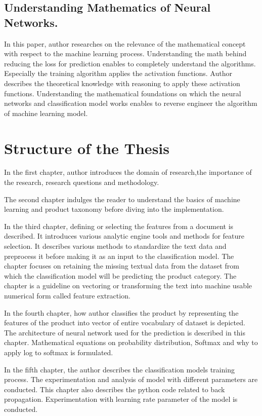 \subsection{Understanding Mathematics of Neural Networks.}

In this paper, author researches on the relevance of the mathematical concept with respect to the machine learning process. Understanding the math behind reducing the loss for prediction enables to completely understand the algorithms. Especially the training algorithm applies the activation functions. Author describes the theoretical knowledge with reasoning to apply these activation functions. Understanding the mathematical foundations on which the neural networks and classification model works enables to reverse engineer the algorithm of machine learning model.

\clearpage

\section{Structure of the Thesis}

In the first chapter, author introduces the domain of research,the importance of the research, research questions and methodology.

The second chapter indulges the reader to understand the basics of machine learning and product taxonomy before diving into the implementation.

In the third chapter, defining or selecting the features from a document is described. It introduces various analytic engine tools and methods for feature selection. It describes various methods to standardize the text data and preprocess it before making it as an input to the classification model. The chapter focuses on retaining the missing textual data from the dataset from which the classification model will be predicting the product category. The chapter is a guideline on vectoring or transforming the text into machine usable numerical form called feature extraction.

In the fourth chapter, how author classifies the product by representing the features of the product into vector of entire vocabulary of dataset is depicted. The architecture of neural network used for the prediction is described in this chapter. Mathematical equations on probability distribution, Softmax and why to apply log to softmax is formulated. 

In the fifth chapter, the author describes the classification models training process. The experimentation and analysis of model with different parameters are conducted. This chapter also describes the python code related to back propagation. Experimentation with learning rate parameter of the model is conducted.

